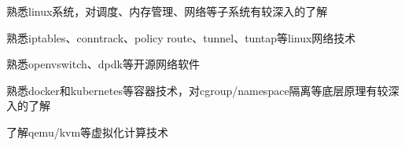   \item 熟悉linux系统，对调度、内存管理、网络等子系统有较深入的了解
  \item 熟悉iptables、conntrack、policy route、tunnel、tuntap等linux网络技术
  \item 熟悉openvswitch、dpdk等开源网络软件
  \item 熟悉docker和kubernetes等容器技术，对cgroup/namespace隔离等底层原理有较深入的了解
  \item 了解qemu/kvm等虚拟化计算技术
